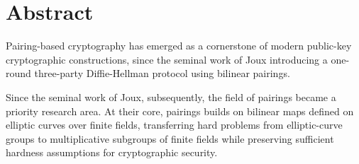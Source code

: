 
\pagestyle{plain}
\chapter*{Abstract}



Pairing-based cryptography has emerged as a cornerstone of modern public-key cryptographic constructions, 
since the seminal work of Joux\cite{joux2004one} introducing a one-round three-party Diffie-Hellman protocol using bilinear pairings. \cite{Menezes2009Pairing}





Since the seminal work of Joux\cite{joux2004one}, subsequently, the field of pairings became a priority research area. 	
At their core, pairings builds on bilinear maps defined on elliptic curves over finite fields, transferring hard problems from elliptic-curve groups to multiplicative subgroups of finite fields while preserving sufficient hardness assumptions for cryptographic security. 



